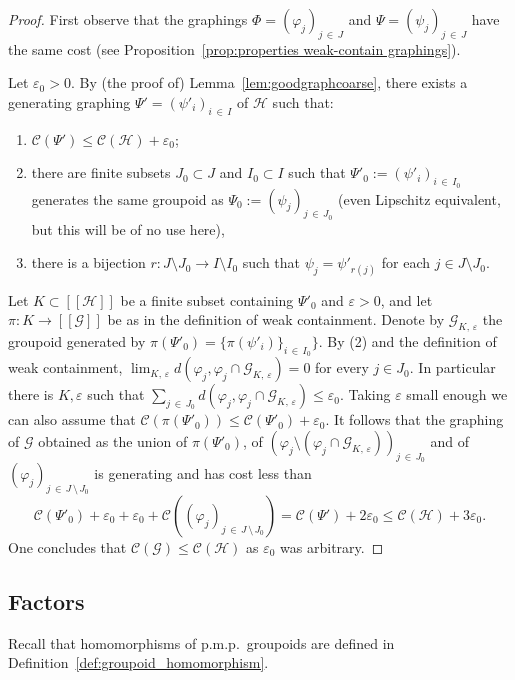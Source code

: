 \documentclass[AHL,Unicode,longabstracts,published]{cedram}
\newcommand{\cH}{\mathcal{H}}
\newcommand{\cost}{\mathcal{C}}
\newcommand{\ch}{\mathcal{H}}
\newcommand{\cg}{\mathcal{G}}
\newcommand{\eps}{\varepsilon}
\newcommand{\ph}{\varphi}
\newcommand{\pmp}{p.m.p.\ }
\begin{document}
\begin{proof}
First observe that the graphings $\Phi=(\ph_j)_{j\,\in \,J}$ and $\Psi=(\psi_j)_{j\,\in\,J}$ have the same cost (see Proposition~\ref{prop:properties weak-contain graphings}).

Let $\eps_0>0$. By (the proof of) Lemma~\ref{lem:goodgraphcoarse}, there exists a generating graphing $\Psi'=(\psi'_i)_{i\,\in\,I}$ of $\ch$ such that:
\begin{enumerate}
\item \label{prooftheo3.22.1}$\cost (\Psi')\leq \cost(\ch)+\eps_0$;
\item \label{prooftheo3.22.2}there are finite subsets $J_0\subset J$ and $I_0\subset I$ such that $\Psi'_{0}:=(\psi'_i)_{i\,\in\,I_0}$ generates the same groupoid as $\Psi_{0}:=(\psi_j)_{j\,\in\,J_0}$ (even Lipschitz equivalent, but this will be of no use here),
\item \label{prooftheo3.22.3}there is a bijection $r:J\setminus J_0\to I\setminus I_0$ such that $\psi_j=\psi'_{r(j)}$ for each $j\in J \setminus J_0$.
\end{enumerate}
Let $K \subset[[\cH]]$ be a finite subset containing $\Psi'_0$ and $\eps>0$, and let $\pi \colon K \to [[\cg]]$ be as in the definition of weak containment. Denote by $\cg_{K,\,\eps}$ the groupoid generated by $\pi(\Psi'_0)=\{ \pi(\psi'_i)\}_{i\,\in\,I_0}\}$. By (2) and the definition of weak containment, $\lim_{K,\,\eps} d(\ph_j,\ph_j \cap \cg_{K,\,\eps})=0$ for every $j \in J_0$. In particular there is $K,\eps$ such that $\sum_{j\,\in\,J_0} d(\ph_j,\ph_j \cap \cg_{K,\,\eps}) \leq \eps_0$. Taking $\eps$ small enough we can also assume that $\cost(\pi(\Psi'_0)) \leq \cost(\Psi'_0)+\eps_0$. It follows that the graphing of $\cg$ obtained as the union of $\pi(\Psi'_0)$, of $(\ph_j \setminus (\ph_j \cap \cg_{K,\,\eps}))_{j\,\in\,J_0}$ and of $(\ph_j)_{j\,\in\,J\,\setminus\,J_0}$ is generating and has cost less than
\[
\cost\left(\Psi'_0\right)+\eps_0+\eps_0 + \cost\left((\ph_j)_{j\,\in\,J\,\setminus\,J_0}\right) = \cost(\Psi')+2\eps_0 \leq \cost(\ch)+3\eps_0.
\]
One concludes that $\cost(\cg) \leq \cost(\ch)$ as $\eps_0$ was arbitrary.
\end{proof}

\pagebreak

\subsection{Factors}

Recall that homomorphisms of \pmp groupoids are defined in Definition~\ref{def:groupoid_homomorphism}.
\end{document}
